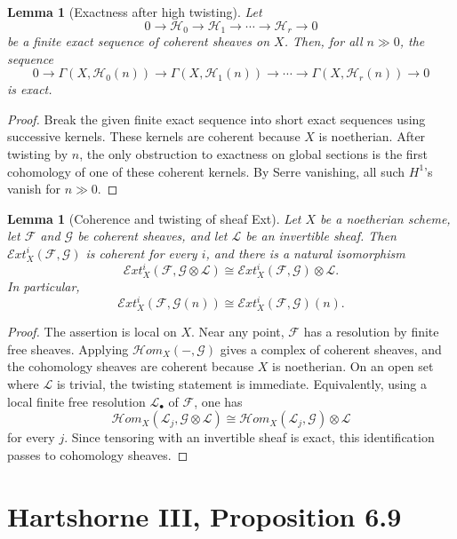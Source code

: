 \documentclass[11pt,a4paper]{article}
\numberwithin{equation}{section}
\theoremstyle{plain}
\newtheorem{lemma}[theorem]{Lemma}
\theoremstyle{definition}
\theoremstyle{remark}
\newcommand{\F}{\mathcal F}
\newcommand{\G}{\mathcal G}
\newcommand{\HH}{\mathcal H}
\newcommand{\LL}{\mathcal L}
\newcommand{\sExt}{\mathcal{E}\!xt}
\newcommand{\sHom}{\mathcal{H}\!om}
\begin{document}
\begin{lemma}[Exactness after high twisting]\label{lem:high-twist-exactness}
Let
\[
  0\longrightarrow \HH_0\longrightarrow \HH_1\longrightarrow\cdots
  \longrightarrow \HH_r\longrightarrow0
\]
be a finite exact sequence of coherent sheaves on \(X\).  Then, for all \(n\gg0\), the sequence
\[
  0\longrightarrow \Gamma(X,\HH_0(n))
  \longrightarrow \Gamma(X,\HH_1(n))
  \longrightarrow\cdots
  \longrightarrow \Gamma(X,\HH_r(n))
  \longrightarrow0
\]
is exact.
\end{lemma}

\begin{proof}
Break the given finite exact sequence into short exact sequences using successive kernels.  These kernels are coherent because \(X\) is noetherian.  After twisting by \(n\), the only obstruction to exactness on global sections is the first cohomology of one of these coherent kernels.  By Serre vanishing, all such \(H^1\)'s vanish for \(n\gg0\).
\end{proof}

\begin{lemma}[Coherence and twisting of sheaf Ext]\label{lem:twist-ext}
Let \(X\) be a noetherian scheme, let \(\F\) and \(\G\) be coherent sheaves, and let \(\LL\) be an invertible sheaf.  Then \(\sExt_X^i(\F,\G)\) is coherent for every \(i\), and there is a natural isomorphism
\[
  \sExt_X^i(\F,\G\otimes\LL)
  \cong
  \sExt_X^i(\F,\G)\otimes\LL.
\]
In particular,
\[
  \sExt_X^i(\F,\G(n))
  \cong
  \sExt_X^i(\F,\G)(n).
\]
\end{lemma}

\begin{proof}
The assertion is local on \(X\).  Near any point, \(\F\) has a resolution by finite free sheaves.  Applying \(\sHom_X(-,\G)\) gives a complex of coherent sheaves, and the cohomology sheaves are coherent because \(X\) is noetherian.  On an open set where \(\LL\) is trivial, the twisting statement is immediate.  Equivalently, using a local finite free resolution \(\LL_\bullet\) of \(\F\), one has
\[
  \sHom_X(\LL_j,\G\otimes\LL)
  \cong
  \sHom_X(\LL_j,\G)\otimes\LL
\]
for every \(j\).  Since tensoring with an invertible sheaf is exact, this identification passes to cohomology sheaves.
\end{proof}

\section{Hartshorne III, Proposition 6.9}
\end{document}

